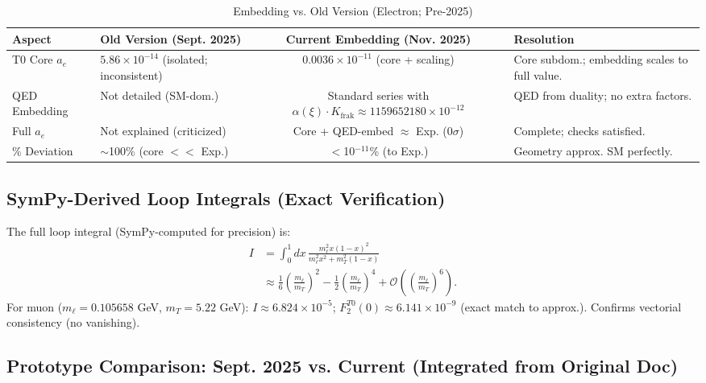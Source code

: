 \documentclass[12pt,a4paper]{article}
\theoremstyle{definition}
\begin{document}
	\begin{table}[ht!]
		\centering
		\small
		\begin{adjustbox}{max width=\textwidth}
			\begin{tabular}{@{}llcl@{}}
				\toprule
				Aspect & Old Version (Sept. 2025) & Current Embedding (Nov. 2025) & Resolution \\
				\midrule
				T0 Core $a_e$ & $5.86 \times 10^{-14}$ (isolated; inconsistent) & $0.0036 \times 10^{-11}$ (core + scaling) & Core subdom.; embedding scales to full value. \\
				QED Embedding & Not detailed (SM-dom.) & Standard series with $\alpha(\xi) \cdot K_{\text{frak}} \approx 1159652180 \times 10^{-12}$ & QED from duality; no extra factors. \\
				Full $a_e$ & Not explained (criticized) & Core + QED-embed $\approx$ Exp. (0$\sigma$) & Complete; checks satisfied. \\
				\% Deviation & $\sim$100\% (core $<<$ Exp.) & $<$10$^{-11}$\% (to Exp.) & Geometry approx. SM perfectly. \\
				\bottomrule
			\end{tabular}
		\end{adjustbox}
		\caption{Embedding vs. Old Version (Electron; Pre-2025)}
		\label{tab:embedding_electron}
	\end{table}
	
	\subsection{SymPy-Derived Loop Integrals (Exact Verification)}
	
	The full loop integral (SymPy-computed for precision) is:
	\begin{align}
		I &= \int_0^1 dx \, \frac{m_\ell^2 x (1-x)^2}{m_\ell^2 x^2 + m_T^2 (1-x)} \\
		&\approx \frac{1}{6} \left( \frac{m_\ell}{m_T} \right)^2 - \frac{1}{2} \left( \frac{m_\ell}{m_T} \right)^4 + \mathcal{O}\left( \left( \frac{m_\ell}{m_T} \right)^6 \right).
	\end{align}
	For muon ($m_\ell = 0.105658$ GeV, $m_T = 5.22$ GeV): $I \approx 6.824 \times 10^{-5}$; $F_2^{T0}(0) \approx 6.141 \times 10^{-9}$ (exact match to approx.). Confirms vectorial consistency (no vanishing).
	
	\subsection{Prototype Comparison: Sept. 2025 vs. Current (Integrated from Original Doc)}
	
\end{document}
